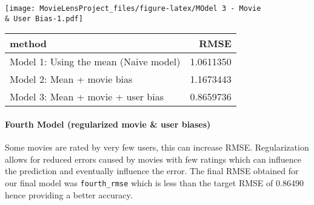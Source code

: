 \documentclass[
]{article}
\newenvironment{Shaded}{\begin{snugshade}}{\end{snugshade}}
\newcommand{\AttributeTok}[1]{\textcolor[rgb]{0.77,0.63,0.00}{#1}}
\newcommand{\FunctionTok}[1]{\textcolor[rgb]{0.00,0.00,0.00}{#1}}
\newcommand{\NormalTok}[1]{#1}
\newcommand{\OtherTok}[1]{\textcolor[rgb]{0.56,0.35,0.01}{#1}}
\newcommand{\SpecialCharTok}[1]{\textcolor[rgb]{0.00,0.00,0.00}{#1}}
\newcommand{\StringTok}[1]{\textcolor[rgb]{0.31,0.60,0.02}{#1}}
\begin{document}
\texttt{[image: MovieLensProject\_files/figure-latex/MOdel 3 - Movie \\\& User Bias-1.pdf]}

\begin{Shaded}
\end{Shaded}

\begin{longtable}[]{@{}lr@{}}
\toprule
method & RMSE \\
\midrule
\endhead
Model 1: Using the mean (Naive model) & 1.0611350 \\
Model 2: Mean + movie bias & 1.1673443 \\
Model 3: Mean + movie + user bias & 0.8659736 \\
\bottomrule
\end{longtable}

\hypertarget{fourth-model-regularized-movie-user-biases}{%
\paragraph{Fourth Model (regularized movie \& user
biases)}\label{fourth-model-regularized-movie-user-biases}}

Some movies are rated by very few users, this can increase RMSE.
Regularization allows for reduced errors caused by movies with few
ratings which can influence the prediction and eventually influence the
error. The final RMSE obtained for our final model was
\texttt{fourth\_rmse} which is less than the target RMSE of 0.86490
hence providing a better accuracy.
\end{document}
